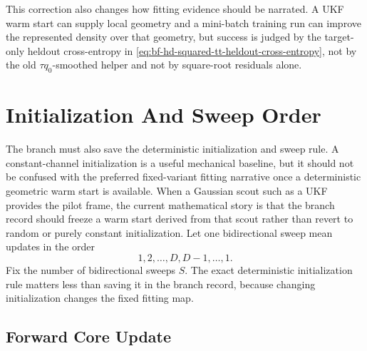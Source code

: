 This correction also changes how fitting evidence should be narrated.  A UKF
warm start can supply local geometry and a mini-batch training run can improve
the represented density over that geometry, but success is judged by the
target-only heldout cross-entropy in
\eqref{eq:bf-hd-squared-tt-heldout-cross-entropy}, not by the old
\(\tau q_0\)-smoothed helper and not by square-root residuals alone.

\section{Initialization And Sweep Order}
\label{sec:bf-hd-squared-tt-init-sweeps}

The branch must also save the deterministic initialization and sweep rule.  A
constant-channel initialization is a useful mechanical baseline, but it should
not be confused with the preferred fixed-variant fitting narrative once a
deterministic geometric warm start is available.  When a Gaussian scout such as
a UKF provides the pilot frame, the current mathematical story is that the
branch record should freeze a warm start derived from that scout rather than
revert to random or purely constant initialization.  Let one bidirectional sweep
mean updates in the order
\begin{equation}
  1,2,\ldots,D,D-1,\ldots,1.
  \label{eq:bf-hd-squared-tt-sweep-order}
\end{equation}
Fix the number of bidirectional sweeps \(S\).  The exact deterministic
initialization rule matters less than saving it in the branch record, because
changing initialization changes the fixed fitting map.

\subsection{Forward Core Update}
\label{sec:bf-hd-squared-tt-forward-core-update}

